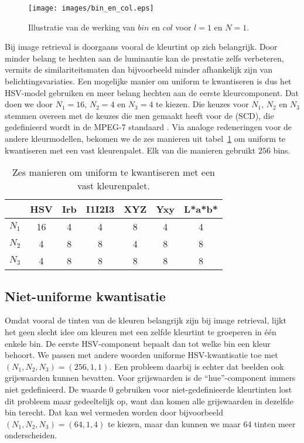 \begin{figure}[!bp]
\vspace{10pt}
\centering
\texttt{[image: images/bin\_en\_col.eps]}
\vspace{10pt}
\caption{\label{fig:bin_en_col}Illustratie van de werking van $bin$ en $col$ voor $l=1$ en $N=1$.}
\end{figure}

Bij image retrieval is doorgaans vooral de kleurtint op zich belangrijk. Door
minder belang te hechten aan de luminantie kan de prestatie zelfs verbeteren,
vermits de similariteitsmaten dan bijvoorbeeld minder afhankelijk zijn van
belichtingsvariaties. 
Een mogelijke manier om uniform te kwantiseren is dus
het HSV-model gebruiken en meer belang hechten aan de eerste kleurcomponent. 
Dat doen we door $N_1=16$, $N_2=4$ en $N_3=4$ te kiezen.
Die keuzes voor $N_1$, $N_2$ en $N_3$ stemmen overeen met de keuzes die men 
gemaakt heeft voor de  (SCD), die gedefinieerd 
wordt in de MPEG-7 standaard \cite{manjunath:color_and_texture_descriptors}.
Via analoge redeneringen voor de andere kleurmodellen, bekomen we de zes manieren 
uit tabel~\ref{tab:uniforme_kwantisatie} om uniform te kwantiseren met een vast kleurenpalet.
Elk van die manieren gebruikt $256$ bins.

\begin{table}[!bp]
\vspace{10pt}
\centering
\begin{tabular}{c|cccccc}
 		& HSV & Irb & I1I2I3 & XYZ & Yxy & L*a*b* \\
\hline
$N_1$ 	& 16 & 4 & 4 & 8 & 4 & 4 \\
$N_2$	& 4  & 8 & 8 & 4 & 8 & 8 \\
$N_3$	& 4  & 8 & 8 & 8 & 8 & 8 \\
\end{tabular}
\vspace{10pt}
\caption{\label{tab:uniforme_kwantisatie}Zes manieren om uniform te kwantiseren met een vast 
kleurenpalet.}
\end{table}


\subsection{Niet-uniforme kwantisatie}

Omdat vooral de tinten van de kleuren belangrijk zijn bij image retrieval, 
lijkt het geen slecht idee om kleuren met een zelfde kleurtint te groeperen in 
\'e\'en enkele bin. De eerste HSV-component bepaalt dan tot welke bin een kleur behoort. We passen
met andere woorden uniforme HSV-kwantisatie toe met $(N_1,N_2,N_3)=(256,1,1)$. Een probleem daarbij 
is echter dat beelden ook grijswaarden kunnen bevatten. Voor grijswaarden is de ``hue''-component immers 
niet gedefinieerd. De waarde 0 gebruiken voor niet-gedefinieerde kleurtinten lost dit probleem maar 
gedeeltelijk op, want dan komen alle grijswaarden in dezelfde bin terecht. Dat kan wel vermeden worden 
door bijvoorbeeld $(N_1,N_2,N_3)=(64,1,4)$ te kiezen, maar dan kunnen we maar 64 tinten meer onderscheiden.

